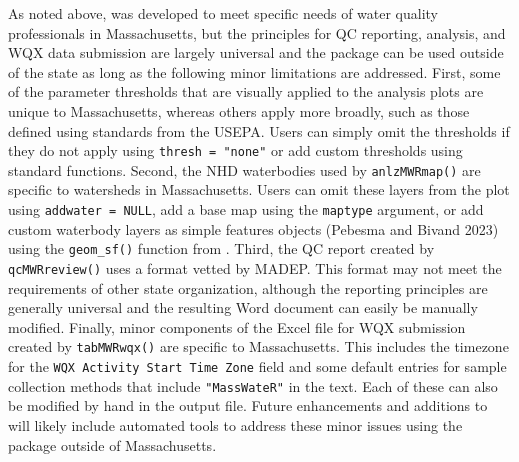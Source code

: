 As noted above,  was developed to meet specific needs of water quality professionals in Massachusetts, but the principles for QC reporting, analysis, and WQX data submission are largely universal and the package can be used outside of the state as long as the following minor limitations are addressed. First, some of the parameter thresholds that are visually applied to the analysis plots are unique to Massachusetts, whereas others apply more broadly, such as those defined using standards from the USEPA. Users can simply omit the thresholds if they do not apply using \texttt{thresh\ =\ "none"} or add custom thresholds using standard  functions. Second, the NHD waterbodies used by \texttt{anlzMWRmap()} are specific to watersheds in Massachusetts. Users can omit these layers from the plot using \texttt{addwater\ =\ NULL}, add a base map using the \texttt{maptype} argument, or add custom waterbody layers as simple features objects (Pebesma and Bivand 2023) using the \texttt{geom\_sf()} function from . Third, the QC report created by \texttt{qcMWRreview()} uses a format vetted by MADEP. This format may not meet the requirements of other state organization, although the reporting principles are generally universal and the resulting Word document can easily be manually modified. Finally, minor components of the Excel file for WQX submission created by \texttt{tabMWRwqx()} are specific to Massachusetts. This includes the timezone for the \texttt{WQX\ Activity\ Start\ Time\ Zone} field and some default entries for sample collection methods that include \texttt{"MassWateR"} in the text. Each of these can also be modified by hand in the output file. Future enhancements and additions to  will likely include automated tools to address these minor issues using the package outside of Massachusetts.

